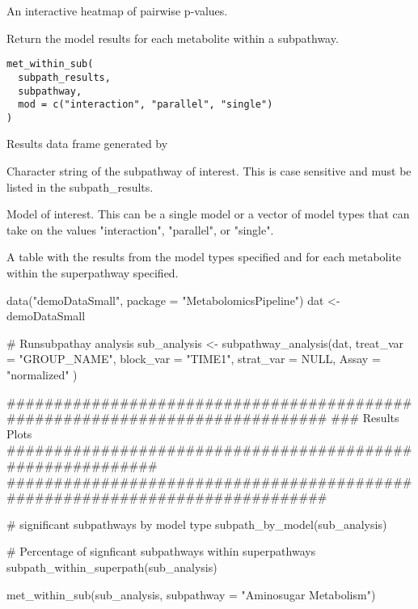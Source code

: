 \documentclass[a4paper]{book}
\begin{document}
%
\begin{Value}
An interactive heatmap of pairwise p-values.
\end{Value}
%
\begin{Description}
Return the model results for each metabolite within a subpathway.
\end{Description}
%
\begin{Usage}
\begin{verbatim}
met_within_sub(
  subpath_results,
  subpathway,
  mod = c("interaction", "parallel", "single")
)
\end{verbatim}
\end{Usage}
%
\begin{Arguments}
\begin{ldescription}
\item[\code{subpath\_results}] Results data frame generated by

\item[\code{subpathway}] Character string of the subpathway of interest.
This is case sensitive and must be listed in the subpath\_results.

\item[\code{mod}] Model of interest. This can be a single model or a vector of
model types that can take on the values "interaction", "parallel",
or "single".
\end{ldescription}
\end{Arguments}
%
\begin{Value}
A table with the results from the model types specified and for each
metabolite within the superpathway specified.
\end{Value}
%
\begin{Examples}
\begin{ExampleCode}
data("demoDataSmall", package = "MetabolomicsPipeline")
dat <- demoDataSmall

# Runsubpathay analysis
sub_analysis <- subpathway_analysis(dat,
    treat_var = "GROUP_NAME",
    block_var = "TIME1",
    strat_var = NULL,
    Assay = "normalized"
)

#############################################################################
### Results Plots ###########################################################
#############################################################################

# significant subpathways by model type
subpath_by_model(sub_analysis)

# Percentage of signficant subpathways within superpathways
subpath_within_superpath(sub_analysis)

met_within_sub(sub_analysis, subpathway = "Aminosugar Metabolism")

\end{ExampleCode}
\end{Examples}
\end{document}
